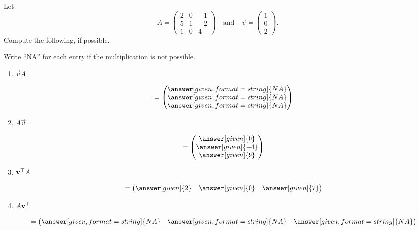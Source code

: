 \documentclass{ximera}
\begin{document}
\begin{question}
  Let
  \[
    A=\begin{pmatrix}
      2 & 0 & -1\\
      5 & 1 & -2\\
      1 & 0 & 4
    \end{pmatrix}
    \quad\text{and}\quad
    \vec{v} = \begin{pmatrix}
      1\\
      0\\
      2
    \end{pmatrix}.
  \]
  Compute the following, if possible.
  \begin{prompt} Write ``NA'' for each entry if the multiplication is not possible.\end{prompt}
  \begin{enumerate}
    \item $\vec{v} A$
      \begin{prompt}
        \[
          =\begin{pmatrix}
            \answer[given,format=string]{NA}\\
            \answer[given,format=string]{NA}\\
            \answer[given,format=string]{NA}
          \end{pmatrix}
        \]
      \end{prompt}
    \item $A\vec{v}$
      \begin{prompt}
        \[
          = \begin{pmatrix}
            \answer[given]{0}\\
            \answer[given]{-4}\\
            \answer[given]{9}
          \end{pmatrix}
        \]
      \end{prompt}
    \item $\mathbf{v}^{\top} A$
      \begin{prompt}
        \[
          = \begin{pmatrix}
            \answer[given]{2} & \answer[given]{0} & \answer[given]{7}
          \end{pmatrix}
        \]
      \end{prompt}
    \item $A\mathbf{v}^{\top}$
      \begin{prompt}
        \[
          = \begin{pmatrix}
            \answer[given,format= string]{NA} & \answer[given,format= string]{NA} & \answer[given,format= string]{NA}
          \end{pmatrix}
        \]
      \end{prompt}
    \pdfOnly{\end{multicols}}
  \end{enumerate}
\end{question}
\end{document}
